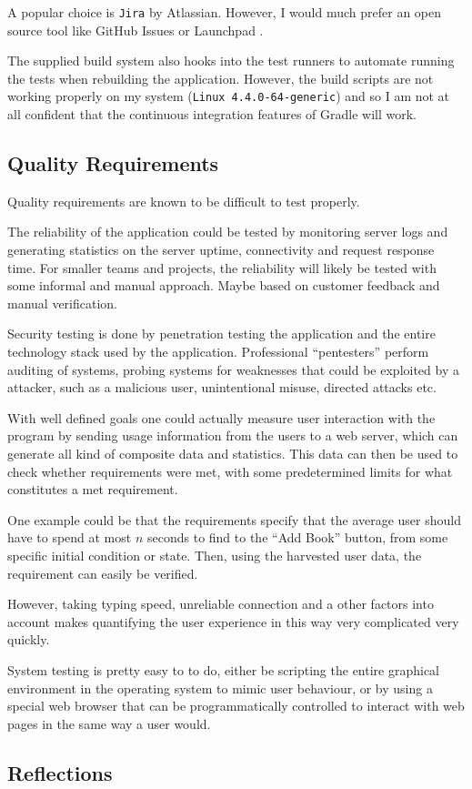 A popular choice is \texttt{Jira}\cite{tools:jira} by Atlassian.
However, I would much prefer an open source tool like GitHub
Issues\cite{tools:github-issues} or Launchpad \cite{tools:launchpad}.

The supplied build system also hooks into the test runners to automate running
the tests when rebuilding the application. However, the build scripts are not
working properly on my system (\texttt{Linux 4.4.0-64-generic}) and so I am not
at all confident that the continuous integration features of Gradle will work.


\subsection{Quality Requirements}
Quality requirements are known to be difficult to test properly.

The reliability of the application could be tested by monitoring server logs
and generating statistics on the server uptime, connectivity and request
response time. For smaller teams and projects, the reliability will likely
be tested with some informal and manual approach. Maybe based on customer
feedback and manual verification.

Security testing is done by penetration testing the application and the entire
technology stack used by the application.
Professional ``pentesters'' perform auditing of systems, probing systems for
weaknesses that could be exploited by a attacker, such as a malicious user,
unintentional misuse, directed attacks etc.

With well defined goals one could actually measure user interaction with the
program by sending usage information from the users to a web server, which can
generate all kind of composite data and statistics. This data can then be used
to check whether requirements were met, with some predetermined limits for what
constitutes a met requirement.

One example could be that the requirements specify that the average user should
have to spend at most $n$ seconds to find to the ``Add Book'' button, from some
specific initial condition or state.
Then, using the harvested user data, the requirement can easily be verified.

However, taking typing speed, unreliable connection and a other factors into
account makes quantifying the user experience in this way very complicated very
quickly.


System testing is pretty easy to to do, either be scripting the entire
graphical environment in the operating system to mimic user behaviour, or by
using a special web browser that can be programmatically controlled to interact
with web pages in the same way a user would.



\subsection{Reflections}\label{task-1c-reflect}



